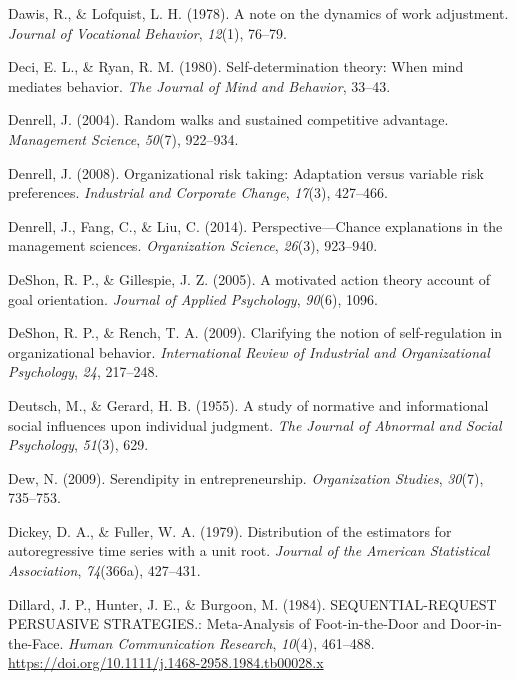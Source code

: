 \documentclass[english,,man]{apa6}
\begin{document}
\leavevmode\hypertarget{ref-dawis_note_1978}{}%
Dawis, R., \& Lofquist, L. H. (1978). A note on the dynamics of work adjustment. \emph{Journal of Vocational Behavior}, \emph{12}(1), 76--79.

\leavevmode\hypertarget{ref-deci_self-determination_1980}{}%
Deci, E. L., \& Ryan, R. M. (1980). Self-determination theory: When mind mediates behavior. \emph{The Journal of Mind and Behavior}, 33--43.

\leavevmode\hypertarget{ref-denrell_random_2004}{}%
Denrell, J. (2004). Random walks and sustained competitive advantage. \emph{Management Science}, \emph{50}(7), 922--934.

\leavevmode\hypertarget{ref-denrell_organizational_2008}{}%
Denrell, J. (2008). Organizational risk taking: Adaptation versus variable risk preferences. \emph{Industrial and Corporate Change}, \emph{17}(3), 427--466.

\leavevmode\hypertarget{ref-denrell_perspectivechance_2014}{}%
Denrell, J., Fang, C., \& Liu, C. (2014). Perspective---Chance explanations in the management sciences. \emph{Organization Science}, \emph{26}(3), 923--940.

\leavevmode\hypertarget{ref-deshon_motivated_2005}{}%
DeShon, R. P., \& Gillespie, J. Z. (2005). A motivated action theory account of goal orientation. \emph{Journal of Applied Psychology}, \emph{90}(6), 1096.

\leavevmode\hypertarget{ref-deshon_clarifying_2009}{}%
DeShon, R. P., \& Rench, T. A. (2009). Clarifying the notion of self-regulation in organizational behavior. \emph{International Review of Industrial and Organizational Psychology}, \emph{24}, 217--248.

\leavevmode\hypertarget{ref-deutsch_study_1955}{}%
Deutsch, M., \& Gerard, H. B. (1955). A study of normative and informational social influences upon individual judgment. \emph{The Journal of Abnormal and Social Psychology}, \emph{51}(3), 629.

\leavevmode\hypertarget{ref-dew_serendipity_2009}{}%
Dew, N. (2009). Serendipity in entrepreneurship. \emph{Organization Studies}, \emph{30}(7), 735--753.

\leavevmode\hypertarget{ref-dickey_distribution_1979}{}%
Dickey, D. A., \& Fuller, W. A. (1979). Distribution of the estimators for autoregressive time series with a unit root. \emph{Journal of the American Statistical Association}, \emph{74}(366a), 427--431.

\leavevmode\hypertarget{ref-dillard_sequential-request_1984}{}%
Dillard, J. P., Hunter, J. E., \& Burgoon, M. (1984). SEQUENTIAL-REQUEST PERSUASIVE STRATEGIES.: Meta-Analysis of Foot-in-the-Door and Door-in-the-Face. \emph{Human Communication Research}, \emph{10}(4), 461--488. \url{https://doi.org/10.1111/j.1468-2958.1984.tb00028.x}
\end{document}
